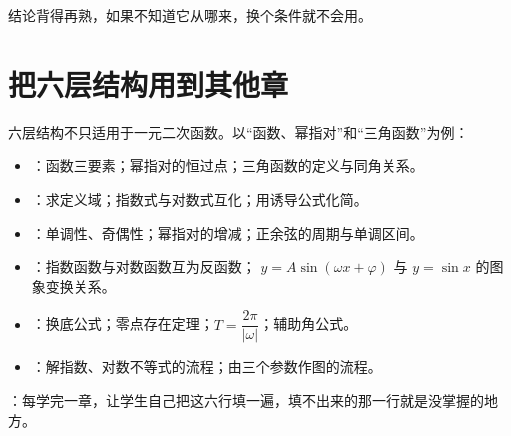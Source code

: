  结论背得再熟，如果不知道它从哪来，换个条件就不会用。

\section{把六层结构用到其他章}

六层结构不只适用于一元二次函数。以“函数、幂指对”和“三角函数”为例：

\begin{itemize}
  \item {}：函数三要素；幂指对的恒过点；三角函数的定义与同角关系。
  \item {}：求定义域；指数式与对数式互化；用诱导公式化简。
  \item {}：单调性、奇偶性；幂指对的增减；正余弦的周期与单调区间。
  \item {}：指数函数与对数函数互为反函数；
        $y=A\sin(\omega x+\varphi)$ 与 $y=\sin x$ 的图象变换关系。
  \item {}：换底公式；零点存在定理；$T=\dfrac{2\pi}{|\omega|}$；辅助角公式。
  \item {}：解指数、对数不等式的流程；由三个参数作图的流程。
\end{itemize}

：每学完一章，让学生自己把这六行填一遍，填不出来的那一行就是没掌握的地方。
